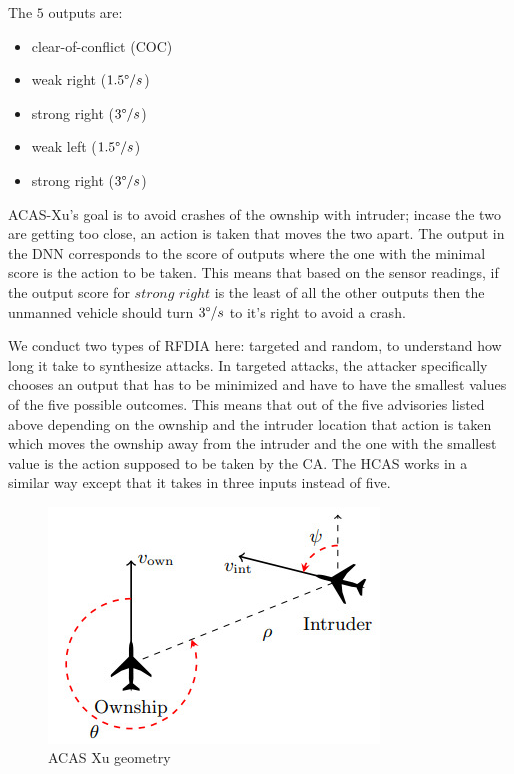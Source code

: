 The $5$ outputs are:
\begin{itemize}[noitemsep,nolistsep]
		\item clear-of-conflict (COC)
	\item weak right ($1.5\degree /s$)
	\item strong right  ($3 \degree /s$)
	\item weak left  ($1.5\degree /s$)
	\item strong right ($3 \degree /s$)
\end{itemize}

\ac{ACAS-Xu}'s goal is to avoid crashes of the ownship with intruder; incase the two are getting too close, an action is taken that moves the two apart. 
The output in the \ac{DNN} corresponds to the score of outputs where the one with the minimal score is the action to be taken. 
This means that based on the sensor readings, if the output score for $strong$ $right$ is the least of all the other outputs then the unmanned vehicle should turn $3 \degree /s$ to it's right to avoid a crash. 




We conduct two types of \ac{RFDIA} here: targeted and random, to understand how long it take to synthesize attacks. 
In targeted attacks, the attacker specifically chooses an output that has to be minimized and have to have the smallest values of the five possible outcomes.
This means that out of the five advisories listed above depending on the ownship and the intruder location that action is taken which moves the ownship away from the intruder and the one with the smallest value is the action supposed to be taken by the \ac{CA}.
The \ac{HCAS} works in a similar way except that it takes in three inputs instead of five. %


\begin{figure}
	\centering
	\includegraphics[width=0.7\linewidth]{Images/ACASXugeometry}
	\caption[ACAS Xu]{ACAS Xu geometry}
	\label{fig:acasxugeometry}
\end{figure}

